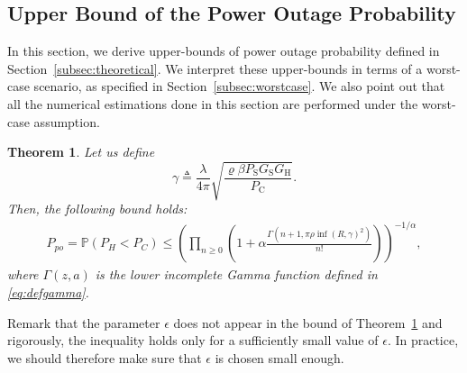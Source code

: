 \documentclass[12pt,draftclsnofoot,onecolumn]{IEEEtran}
\newtheorem{theorem}{Theorem}
\begin{document}
\subsection{Upper Bound of the Power Outage Probability}
 \label{sec:upperboundpoutage}
 
In this section, we derive upper-bounds of power outage probability defined in Section~\ref{subsec:theoretical}. We interpret these upper-bounds in terms of a worst-case scenario, as specified in Section~\ref{subsec:worstcase}. We also point out that all the numerical estimations done in this section are performed under the worst-case assumption. 

\begin{theorem}
\label{thm:estimationphi}
Let us define 
\begin{equation*}
\gamma\triangleq \frac\lambda{4\pi}\sqrt{ \frac{\varrho\beta P_{\mathrm{S}}G_{\mathrm{S}} G_{\mathrm{H}} }{P_{\mathrm{C}} } }.
\end{equation*}
Then, the following bound holds:
\begin{eqnarray} \label{DPP_poweroutage}
P_{po} = \mathbb{P} (P_H<P_C)
\le  \left(\prod_{n\ge 0} \left(1+\alpha  \frac{\Gamma(n+1, \pi\rho\inf(R,\gamma)^2)}{n!}\right)\right)^{-1/\alpha},
\end{eqnarray}
where $\Gamma(z,a)$ is the lower incomplete Gamma function defined in \eqref{eq:defgamma}.
\end{theorem}
Remark that the parameter $\epsilon$ does not appear in the bound of Theorem~\ref{thm:estimationphi} and rigorously, the inequality holds only for a sufficiently small value of $\epsilon$. In practice, we should therefore make sure that $\epsilon$ is chosen small enough.
\end{document}
